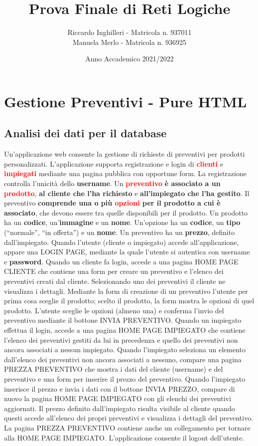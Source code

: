 \documentclass[a4paper, 12pt]{article}
\title{Prova Finale di Reti Logiche}
\author{Riccardo Inghilleri - Matricola n. 937011\\Manuela Merlo - Matricola n. 936925}
\date{Anno Accademico 2021/2022}
\begin{document}

\tableofcontents
\newpage
\section{Gestione Preventivi - Pure HTML}
\subsection{Analisi dei dati per il database}
Un’applicazione web consente la gestione di richieste di preventivi per prodotti personalizzati. L’applicazione supporta registrazione e login di \textbf{\textcolor{red}{clienti}} e \textbf{\textcolor{red}{impiegati}} mediante una pagina pubblica con opportune form. La registrazione controlla l’unicità dello \textbf{\textcolor{myGreen}{username}}. Un \textbf{\textcolor{red}{preventivo}} \textbf{\textcolor{myBlue}{è associato a un}} \textbf{\textcolor{red}{prodotto}}, \textbf{\textcolor{myBlue}{al cliente che l’ha richiesto}} e \textbf{\textcolor{myBlue}{all’impiegato che l’ha gestito}}. Il preventivo \textbf{\textcolor{myBlue}{comprende una o più} \textcolor{red}{opzioni} \textcolor{myBlue}{per il prodotto a cui è associato}}, che devono essere tra quelle disponibili per il prodotto. Un prodotto ha un \textbf{\textcolor{myGreen}{codice}}, un’\textbf{\textcolor{myGreen}{immagine}} e un \textbf{\textcolor{myGreen}{nome}}. Un’opzione ha un \textbf{\textcolor{myGreen}{codice}}, un \textbf{\textcolor{myGreen}{tipo}} (“normale”, “in offerta”) e un \textbf{\textcolor{myGreen}{nome}}. Un preventivo ha un \textbf{\textcolor{myGreen}{prezzo}}, definito dall’impiegato. Quando l’utente (cliente o impiegato) accede all’applicazione, appare una LOGIN PAGE, mediante la quale l’utente si autentica con username e \textbf{\textcolor{myGreen}{password}}. Quando un cliente fa login, accede a una pagina HOME PAGE CLIENTE che contiene una form per creare un preventivo e l’elenco dei preventivi creati dal cliente. Selezionando uno dei preventivi il cliente ne visualizza i dettagli. Mediante la form di creazione di un preventivo l’utente per prima cosa sceglie il prodotto; scelto il prodotto, la form mostra le opzioni di quel prodotto. L’utente sceglie le opzioni (almeno una) e conferma l’invio del preventivo mediante il bottone INVIA PREVENTIVO. Quando un impiegato effettua il login, accede a una pagina HOME PAGE IMPIEGATO che contiene l’elenco dei preventivi gestiti da lui in precedenza e quello dei preventivi non ancora associati a nessun impiegato. Quando l’impiegato seleziona un elemento dall’elenco dei preventivi non ancora associati a nessuno, compare una pagina PREZZA PREVENTIVO che mostra i dati del cliente (username) e del preventivo e una form per inserire il prezzo del preventivo. Quando l’impiegato inserisce il prezzo e invia i dati con il bottone INVIA PREZZO, compare di nuovo la pagina HOME PAGE IMPIEGATO con gli elenchi dei preventivi aggiornati. Il prezzo definito dall’impiegato risulta visibile al cliente quando questi accede all’elenco dei propri preventivi e visualizza i dettagli del preventivo. La pagina PREZZA PREVENTIVO contiene anche un collegamento per tornare alla HOME PAGE IMPIEGATO. L’applicazione consente il logout dell’utente.\\
\end{document}
